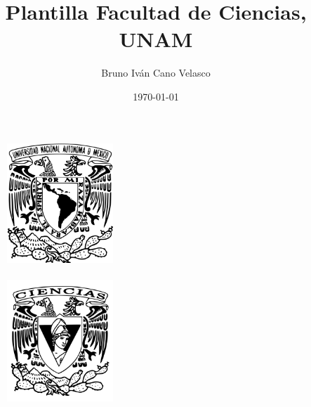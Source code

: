 \documentclass{article}
\title{Plantilla Facultad de Ciencias, UNAM}
\author{Bruno Iván Cano Velasco}
\date{\today}
\begin{document}
\thispagestyle{empty}

        \begin{figure}[ht]
            \includegraphics[width=4cm]{images/logo_unam.png}
            \label{EscudoUNAM}   
            \endminipage

                \includegraphics[height = 4.9cm ,width=4cm]{images/logo_ciencias.png}
                \label{EscudoFC}
            \endminipage
        \end{figure}
\end{document}
